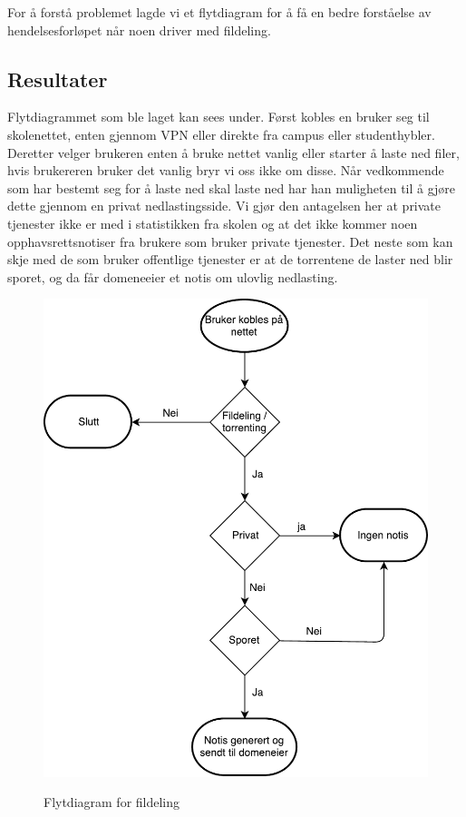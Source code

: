 For å forstå problemet lagde vi et flytdiagram for å få en bedre forståelse av hendelsesforløpet når noen driver med fildeling.

\subsection{Resultater}
Flytdiagrammet som ble laget kan sees under. Først kobles en bruker seg til skolenettet, enten gjennom VPN eller direkte fra campus eller studenthybler. Deretter velger brukeren enten å bruke nettet vanlig eller starter å laste ned filer, hvis brukereren bruker det vanlig bryr vi oss ikke om disse. Når vedkommende som har bestemt seg for å laste ned skal laste ned har han muligheten til å gjøre dette gjennom en privat nedlastingsside. Vi gjør den antagelsen her at private tjenester ikke er med i statistikken fra skolen og at det ikke kommer noen opphavsrettsnotiser fra brukere som bruker private tjenester. Det neste som kan skje med de som bruker offentlige tjenester er at de torrentene de laster ned blir sporet, og da får domeneeier et notis om ulovlig nedlasting.
\begin{figure}[H]
    \centering
    \includegraphics[scale=0.5]{case_1/bilder/Flowchart.pdf}
    \label{fig:Flytdiagram}
    \caption[Flytdiagram for fildeling]{Flytdiagram for fildeling}
\end{figure}


